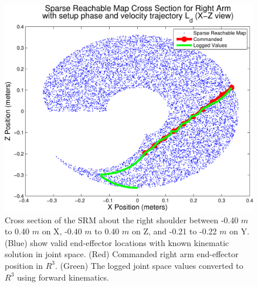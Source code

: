 \begin{figure}[thpb]
  \centering
\includegraphics[width=1.0\columnwidth]{./MATLAB/throwTrajAct.pdf}
\caption{Cross section of the SRM about the right shoulder between -0.40 $m$ to 0.40 $m$ on X, -0.40 $m$ to 0.40 $m$ on Z, and -0.21 to -0.22 $m$ on Y.  (Blue) show valid end-effector locations with known kinematic solution in joint space. (Red) Commanded right arm end-effector position in $R^3$.  (Green) The logged joint space values converted to $R^3$ using forward kinematics.
}
  \label{fig:sparseRegion}
\end{figure}

